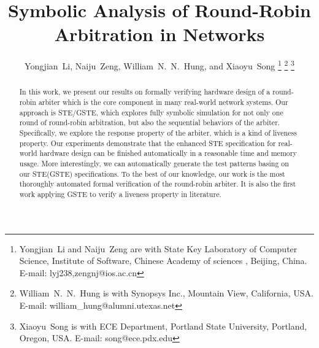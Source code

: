 \documentclass[final]{IEEEtran}
\begin{document}
\title{Symbolic Analysis of Round-Robin Arbitration in Networks
}


\author{Yongjian~Li, Naiju~Zeng, William~N.~N.~Hung, and Xiaoyu~Song \thanks{%
Yongjian~Li and Naiju~Zeng are with State Key Laboratory of Computer
Science, Institute of Software, Chinese Academy of sciences ,
Beijing, China.
E-mail: lyj238,zengnj@ios.ac.cn}%
\thanks{William~N.~N.~Hung is with Synopsys Inc., Mountain View,
California, USA.
E-mail: william\_hung@alumni.utexas.net}%
\thanks{Xiaoyu~Song is with ECE Department, Portland State
University, Portland, Oregon, USA. E-mail: song@ece.pdx.edu}}


\maketitle


\begin{abstract}
In this work, we present our results on formally verifying hardware
design of a round-robin arbiter which is the core component in many
real-world network systems. Our approach is  STE/GSTE, which
explores fully symbolic simulation for not only one round of
round-robin arbitration, but also the sequential behaviors of the
arbiter. Specifically, we explore the response property of the
arbiter, which is a kind of liveness property. Our experiments
demonstrate that the enhanced STE specification for real-world
hardware design can be finished automatically in a reasonable time
and memory usage. More interestingly, we can automatically generate
the test patterns basing on our STE(GSTE) specifications. To the
best of our knowledge, our work is the most thoroughly automated
formal verification of the round-robin arbiter. It is also the first
work applying GSTE to verify a liveness property in literature.
\end{abstract}
\end{document}

